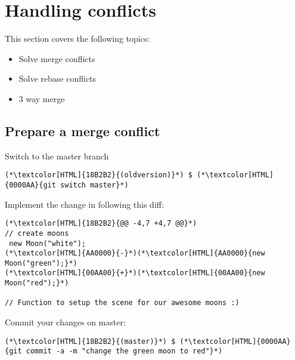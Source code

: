 \section{Handling conflicts}
\begin{frame}[fragile]
  \slidetitle
  This section covers the following topics:
  \begin{itemize}
    \item Solve merge conflicts
    \item Solve rebase conflicts
    \item 3 way merge
  \end{itemize}
\end{frame}

\subsection{Prepare a merge conflict}
\begin{frame}[fragile]
  \subslidetitle
  Switch to the master branch
  \begin{lstlisting}
(*\textcolor[HTML]{18B2B2}{(oldversion)}*) $ (*\textcolor[HTML]{0000AA}{git switch master}*)
\end{lstlisting}
  Implement the change in  following this diff:
  \begin{lstlisting}
(*\textcolor[HTML]{18B2B2}{@@ -4,7 +4,7 @@}*)
// create moons
 new Moon("white");
(*\textcolor[HTML]{AA0000}{-}*)(*\textcolor[HTML]{AA0000}{new Moon("green");}*)
(*\textcolor[HTML]{00AA00}{+}*)(*\textcolor[HTML]{00AA00}{new Moon("red");}*)

// Function to setup the scene for our awesome moons :)
\end{lstlisting}

  Commit your changes on master:
  \begin{lstlisting}
(*\textcolor[HTML]{18B2B2}{(master)}*) $ (*\textcolor[HTML]{0000AA}{git commit -a -m "change the green moon to red"}*)
\end{lstlisting}

\end{frame}


